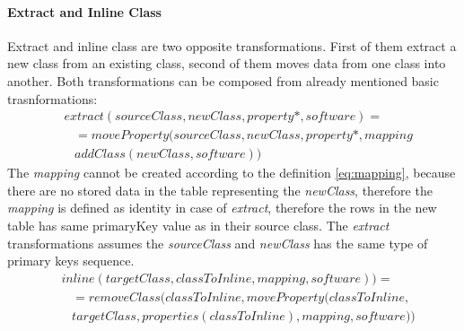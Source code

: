 \documentclass[runningheads]{comsis}
\begin{document}
\paragraph{Extract and Inline Class}
Extract and inline class are two opposite transformations. First of them extract a new class from an existing class, second of them moves data from one class into another. Both transformations can be composed from already mentioned basic trasnformations:
\begin{align}
& extract(sourceClass, newClass, property*, software) = \nonumber  \\ 
& \; \; \; = moveProperty(sourceClass, newClass, property*, mapping \nonumber \\ 
& \; \; \; addClass(newClass, software))
\end{align}
The \emph{mapping} cannot be created according to the definition \ref{eq:mapping}, because there are no stored data in the table representing the \emph{newClass}, therefore the \emph{mapping} is defined as identity in case of \emph{extract}, therefore the rows in the new table has same primaryKey value as in their source class. The \emph{extract} transformations assumes the \emph{sourceClass} and \emph{newClass} has the same type of primary keys sequence. 
\begin{align}
& inline(targetClass, classToInline, mapping, software)) =  \nonumber \\
& \; \; \; = removeClass(classToInline, moveProperty(classToInline, \nonumber \\
& \; \; \; targetClass, properties(classToInline), mapping, software))
\end{align}
\end{document}
